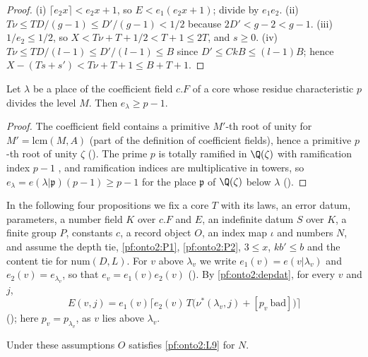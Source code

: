 \begin{proof}
(i) $\lceil e_2x\rceil<e_2x+1$, so $E<e_1(e_2x+1)$; divide by $e_1e_2$. (ii) $T\nu\le TD/(g-1)\le D'/(g-1)<1/2$ because
$2D'<g-2<g-1$. (iii) $1/e_2\le1/2$, so $X<T\nu+T+1/2<T+1\le2T$, and $s\ge0$. (iv) $T\nu\le TD/(l-1)\le D'/(l-1)\le B$ since
$D'\le CkB\le(l-1)B$; hence $X-(Ts+s')<T\nu+T+1\le B+T+1$.
\end{proof}

\begin{lemma}\label{pf:onto2:ramlevel}
Let $\lambda$ be a place of the coefficient field $c.F$ of a core whose residue characteristic $p$ divides the level $M$. Then
$e_\lambda\ge p-1$.
\end{lemma}

\begin{proof}
The coefficient field contains a primitive $M'$-th root of unity for $M'=\mathrm{lcm}(M,A)$ (part of the definition of coefficient
fields), hence a primitive $p$-th root of unity $\zeta$ (). The prime $p$ is totally
ramified in $\Q(\zeta)$ with ramification index $p-1$ \cite[Lemma~1.4]{Washington1997}, and ramification indices are
multiplicative in towers, so $e_\lambda=e(\lambda|\mathfrak p)(p-1)\ge p-1$ for the place $\mathfrak p$ of $\Q(\zeta)$ below $\lambda$
().
\end{proof}

In the following four propositions we fix a core $T$ with its laws, an error datum, parameters, a number field $K$ over $c.F$ and
$E$, an indefinite datum $S$ over $K$, a finite group $P$, constants $c$, a record object $O$, an index map $\iota$ and numbers
$N$, and assume the depth tie, \ref{pf:onto2:P1}, \ref{pf:onto2:P2}, $3\le x$, $kb'\le b$ and the content tie for
$\mathrm{num}(D,L)$. For $v$ above $\lambda_v$ we write $e_1(v)=e(v|\lambda_v)$ and $e_2(v)=e_{\lambda_v}$, so that $e_v=e_1(v)e_2(v)$
(). By \cref{pf:onto2:depdat}, for every $v$ and $j$,
\begin{equation}\label{eq:pf:onto2:tieE}
E(v,j)=e_1(v)\bigl\lceil e_2(v)\,T\bigl(\nu^*(\lambda_v,j)+[p_v\ \text{bad}]\bigr)\bigr\rceil
\end{equation}
(); here $p_v=p_{\lambda_v}$, as $v$ lies above $\lambda_v$.

\begin{proposition}\label{pf:onto2:dlevel}
Under these assumptions $O$ satisfies \ref{pf:onto2:L9} for $N$.
\end{proposition}

